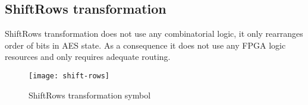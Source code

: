 \subsection{ShiftRows transformation}

ShiftRows transformation does not use any combinatorial logic, it only rearranges order of bits in AES state. As a consequence it does not use any FPGA logic resources and only requires adequate routing.

\begin{figure}[!h]
\centering
\texttt{[image: shift-rows]}
\caption{ShiftRows transformation symbol}
\label{fig:shift-rows}
\end{figure}